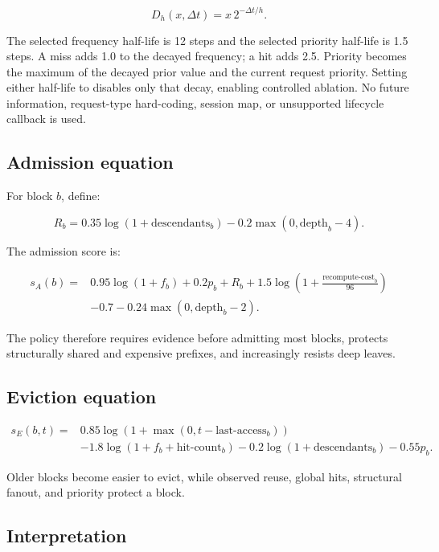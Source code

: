 \documentclass[11pt]{article}
\newcommand{\code}[1]{\texttt{\detokenize{#1}}}
\begin{document}
\begin{equation}
  D_h(x,\Delta t) = x\,2^{-\Delta t/h}.
\end{equation}

The selected frequency half-life is 12 steps and the selected priority half-life is
1.5 steps.  A miss adds 1.0 to the decayed frequency; a hit adds 2.5.  Priority becomes
the maximum of the decayed prior value and the current request priority.  Setting
either half-life to \code{None} disables only that decay, enabling controlled ablation.
No future information, request-type hard-coding, session map, or unsupported lifecycle
callback is used.

\subsection{Admission equation}

For block \(b\), define:

\begin{equation}
  R_b =
  0.35\log(1+\text{descendants}_b)
  -0.2\max(0,\text{depth}_b-4).
\end{equation}

The admission score is:

\begin{align}
  s_A(b) ={}&
  0.95\log(1+f_b)
  +0.2p_b
  +R_b
  +1.5\log\left(1+\frac{\text{recompute-cost}_b}{96}\right) \nonumber\\
  &-0.7
  -0.24\max(0,\text{depth}_b-2).
\end{align}

The policy therefore requires evidence before admitting most blocks, protects
structurally shared and expensive prefixes, and increasingly resists deep leaves.

\subsection{Eviction equation}

\begin{align}
  s_E(b,t) ={}&
  0.85\log(1+\max(0,t-\text{last-access}_b)) \nonumber\\
  &-1.8\log(1+f_b+\text{hit-count}_b)
  -0.2\log(1+\text{descendants}_b)
  -0.55p_b.
\end{align}

Older blocks become easier to evict, while observed reuse, global hits, structural
fanout, and priority protect a block.

\subsection{Interpretation}
\end{document}
